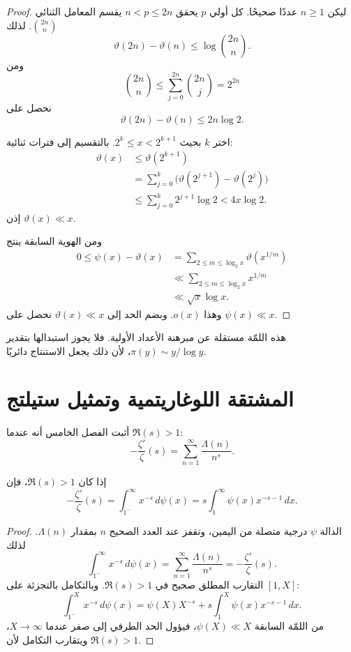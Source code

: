 \begin{proof}
ليكن \(n\ge1\) عددًا صحيحًا. كل أولي \(p\) يحقق
\(n<p\le2n\) يقسم المعامل الثنائي \(\binom{2n}{n}\). لذلك
\[
\vartheta(2n)-\vartheta(n)
\le
\log\binom{2n}{n}.
\]
ومن
\[
\binom{2n}{n}
\le
\sum_{j=0}^{2n}\binom{2n}{j}
=2^{2n}
\]
نحصل على
\[
\vartheta(2n)-\vartheta(n)
\le2n\log2.
\]

اختر \(k\) بحيث \(2^k\le x<2^{k+1}\). بالتقسيم إلى فترات ثنائية:
\begin{align*}
\vartheta(x)
&\le\vartheta(2^{k+1})\\
&=
\sum_{j=0}^{k}
\bigl(\vartheta(2^{j+1})-\vartheta(2^j)\bigr)\\
&\le
\sum_{j=0}^{k}2^{j+1}\log2
<4x\log2.
\end{align*}
إذن \(\vartheta(x)\ll x\).

ومن الهوية السابقة ينتج
\begin{align*}
0\le\psi(x)-\vartheta(x)
&=
\sum_{2\le m\le\log_2x}
\vartheta\!\left(x^{1/m}\right)\\
&\ll
\sum_{2\le m\le\log_2x}x^{1/m}\\
&\ll
\sqrt{x}\log x.
\end{align*}
وهذا \(o(x)\). وبضم الحد إلى \(\vartheta(x)\ll x\) نحصل على
\(\psi(x)\ll x\).
\end{proof}

هذه اللمّة مستقلة عن مبرهنة الأعداد الأولية. فلا يجوز استبدالها بتقدير
\(\pi(y)\sim y/\log y\)، لأن ذلك يجعل الاستنتاج دائريًا.

\section{المشتقة اللوغاريتمية وتمثيل ستيلتج}

أثبت الفصل الخامس أنه عندما \(\Re(s)>1\):
\[
-\frac{\zeta'}{\zeta}(s)
=
\sum_{n=1}^{\infty}\frac{\Lambda(n)}{n^s}.
\]

\begin{proposition}
\label{prop:psi-stieltjes-representation}
\provedhere
إذا كان \(\Re(s)>1\)، فإن
\[
-\frac{\zeta'}{\zeta}(s)
=
\int_{1^-}^{\infty}x^{-s}\,d\psi(x)
=
s\int_1^{\infty}\psi(x)x^{-s-1}\,dx.
\]
\end{proposition}

\begin{proof}
الدالة \(\psi\) درجية متصلة من اليمين، وتقفز عند العدد الصحيح \(n\)
بمقدار \(\Lambda(n)\). لذلك
\[
\int_{1^-}^{\infty}x^{-s}\,d\psi(x)
=
\sum_{n=1}^{\infty}\frac{\Lambda(n)}{n^s}
=
-\frac{\zeta'}{\zeta}(s).
\]
التقارب المطلق صحيح في \(\Re(s)>1\). وبالتكامل بالتجزئة على \([1,X]\):
\[
\int_{1^-}^{X}x^{-s}\,d\psi(x)
=
\psi(X)X^{-s}
+s\int_1^X\psi(x)x^{-s-1}\,dx.
\]
من اللمّة السابقة \(\psi(X)\ll X\)، فيؤول الحد الطرفي إلى صفر عندما
\(X\to\infty\)، ويتقارب التكامل لأن \(\Re(s)>1\).
\end{proof}

